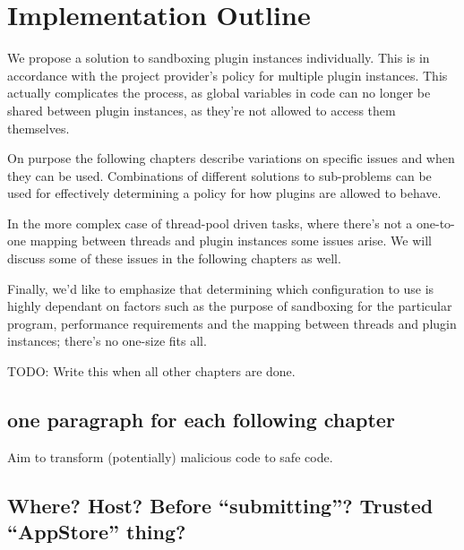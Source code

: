 \chapter {Implementation Outline}

We propose a solution to sandboxing plugin instances individually.
This is in accordance with the project provider's policy for multiple plugin
instances.
This actually complicates the process, as global variables in code can no
longer be shared between plugin instances, as they're not allowed to access
them themselves.

On purpose the following chapters describe variations on specific issues and
when they can be used.
Combinations of different solutions to sub-problems can be used for effectively
determining a policy for how plugins are allowed to behave.

In the more complex case of thread-pool driven tasks, where there's not a
one-to-one mapping between threads and plugin instances some issues arise.
We will discuss some of these issues in the following chapters as well.

Finally, we'd like to emphasize that determining which configuration to use is
highly dependant on factors such as the purpose of sandboxing for the
particular program, performance requirements and the mapping between threads
and plugin instances; there's no one-size fits all.

TODO: Write this when all other chapters are done.


\section {one paragraph for each following chapter}

Aim to transform (potentially) malicious code to safe code.


\section {Where? Host? Before ``submitting''? Trusted ``AppStore'' thing?}


